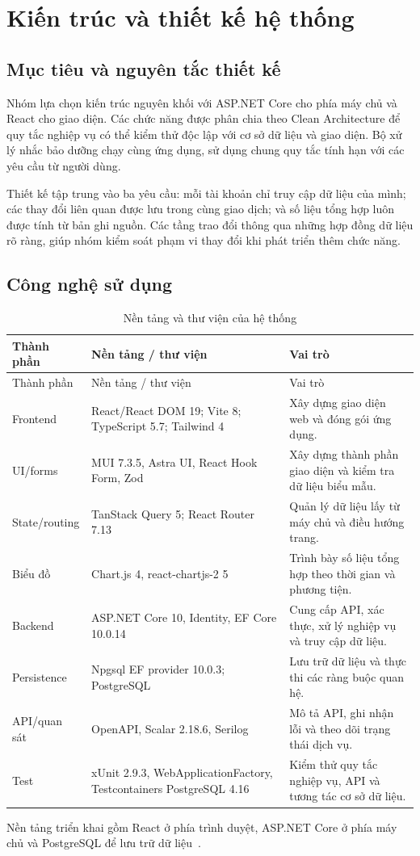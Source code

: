 \chapter{Kiến trúc và thiết kế hệ thống}\label{chap:architecture}
\section{Mục tiêu và nguyên tắc thiết kế}
Nhóm lựa chọn kiến trúc nguyên khối với ASP.NET Core cho phía máy chủ và React cho giao diện. Các chức năng được phân chia theo Clean Architecture để quy tắc nghiệp vụ có thể kiểm thử độc lập với cơ sở dữ liệu và giao diện. Bộ xử lý nhắc bảo dưỡng chạy cùng ứng dụng, sử dụng chung quy tắc tính hạn với các yêu cầu từ người dùng.

Thiết kế tập trung vào ba yêu cầu: mỗi tài khoản chỉ truy cập dữ liệu của mình; các thay đổi liên quan được lưu trong cùng giao dịch; và số liệu tổng hợp luôn được tính từ bản ghi nguồn. Các tầng trao đổi thông qua những hợp đồng dữ liệu rõ ràng, giúp nhóm kiểm soát phạm vi thay đổi khi phát triển thêm chức năng.

\section{Công nghệ sử dụng}
\begin{smalltable}\begin{longtable}{L{3cm}L{5.5cm}L{6.1cm}}
\caption{Nền tảng và thư viện của hệ thống}\label{tab:stack}\\\toprule Thành phần & Nền tảng / thư viện & Vai trò\\\midrule\endfirsthead
\toprule Thành phần & Nền tảng / thư viện & Vai trò\\\midrule\endhead
Frontend & React/React DOM 19; Vite 8; TypeScript 5.7; Tailwind 4 & Xây dựng giao diện web và đóng gói ứng dụng.\\
UI/forms & MUI 7.3.5, Astra UI, React Hook Form, Zod & Xây dựng thành phần giao diện và kiểm tra dữ liệu biểu mẫu.\\
State/routing & TanStack Query 5; React Router 7.13 & Quản lý dữ liệu lấy từ máy chủ và điều hướng trang.\\
Biểu đồ & Chart.js 4, react-chartjs-2 5 & Trình bày số liệu tổng hợp theo thời gian và phương tiện.\\
Backend & ASP.NET Core 10, Identity, EF Core 10.0.14 & Cung cấp API, xác thực, xử lý nghiệp vụ và truy cập dữ liệu.\\
Persistence & Npgsql EF provider 10.0.3; PostgreSQL & Lưu trữ dữ liệu và thực thi các ràng buộc quan hệ.\\
API/quan sát & OpenAPI, Scalar 2.18.6, Serilog & Mô tả API, ghi nhận lỗi và theo dõi trạng thái dịch vụ.\\
Test & xUnit 2.9.3, WebApplicationFactory, Testcontainers PostgreSQL 4.16 & Kiểm thử quy tắc nghiệp vụ, API và tương tác cơ sở dữ liệu.\\\bottomrule
\end{longtable}\end{smalltable}
Nền tảng triển khai gồm React ở phía trình duyệt, ASP.NET Core ở phía máy chủ và PostgreSQL để lưu trữ dữ liệu~\cite{repo,backend}.

